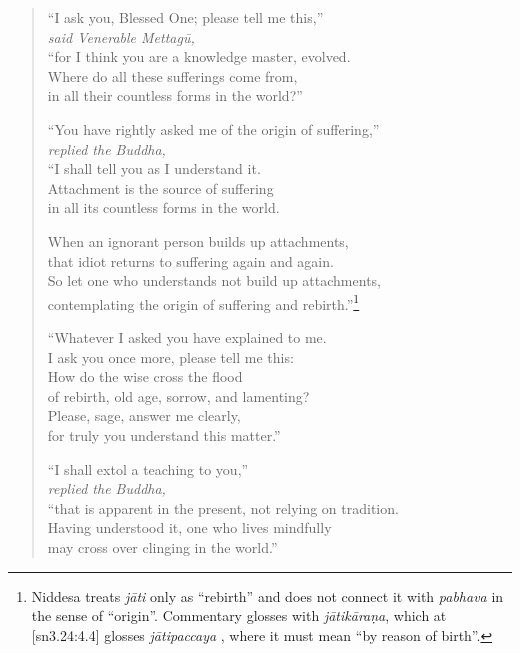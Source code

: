 \documentclass[12pt,openany]{book}%
\newcommand*{\scspeaker}[1]{\hspace{2em}\textit{#1}}
\begin{document}
\begin{verse}%
“I ask you, Blessed One; please tell me this,” \\
\scspeaker{said Venerable \textsanskrit{Mettagū}, }\\
“for I think you are a knowledge master, evolved. \\
Where do all these sufferings come from, \\
in all their countless forms in the world?” 

“You have rightly asked me of the origin of suffering,” \\
\scspeaker{replied the Buddha, }\\
“I shall tell you as I understand it. \\
Attachment is the source of suffering \\
in all its countless forms in the world. 

When an ignorant person builds up attachments, \\
that idiot returns to suffering again and again. \\
So let one who understands not build up attachments, \\
contemplating the origin of suffering and rebirth.”\footnote{Niddesa treats \textit{\textsanskrit{jāti}} only as “rebirth” and does not connect it with \textit{pabhava} in the sense of “origin”. Commentary glosses with \textit{\textsanskrit{jātikāraṇa}}, which at [sn3.24:4.4] glosses \textit{\textsanskrit{jātipaccaya}} , where it must mean “by reason of birth”. } 

“Whatever I asked you have explained to me. \\
I ask you once more, please tell me this: \\
How do the wise cross the flood \\
of rebirth, old age, sorrow, and lamenting? \\
Please, sage, answer me clearly, \\
for truly you understand this matter.” 

“I shall extol a teaching to you,” \\
\scspeaker{replied the Buddha, }\\
“that is apparent in the present, not relying on tradition. \\
Having understood it, one who lives mindfully \\
may cross over clinging in the world.” 


\end{verse}
\end{document}
